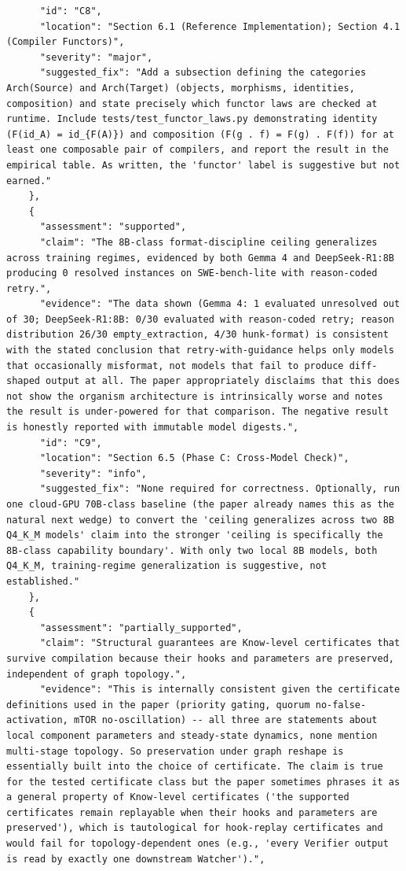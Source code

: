 \documentclass[11pt]{article}
\begin{document}
\begin{verbatim}
      "id": "C8",
      "location": "Section 6.1 (Reference Implementation); Section 4.1 (Compiler Functors)",
      "severity": "major",
      "suggested_fix": "Add a subsection defining the categories Arch(Source) and Arch(Target) (objects, morphisms, identities, composition) and state precisely which functor laws are checked at runtime. Include tests/test_functor_laws.py demonstrating identity (F(id_A) = id_{F(A)}) and composition (F(g . f) = F(g) . F(f)) for at least one composable pair of compilers, and report the result in the empirical table. As written, the 'functor' label is suggestive but not earned."
    },
    {
      "assessment": "supported",
      "claim": "The 8B-class format-discipline ceiling generalizes across training regimes, evidenced by both Gemma 4 and DeepSeek-R1:8B producing 0 resolved instances on SWE-bench-lite with reason-coded retry.",
      "evidence": "The data shown (Gemma 4: 1 evaluated unresolved out of 30; DeepSeek-R1:8B: 0/30 evaluated with reason-coded retry; reason distribution 26/30 empty_extraction, 4/30 hunk-format) is consistent with the stated conclusion that retry-with-guidance helps only models that occasionally misformat, not models that fail to produce diff-shaped output at all. The paper appropriately disclaims that this does not show the organism architecture is intrinsically worse and notes the result is under-powered for that comparison. The negative result is honestly reported with immutable model digests.",
      "id": "C9",
      "location": "Section 6.5 (Phase C: Cross-Model Check)",
      "severity": "info",
      "suggested_fix": "None required for correctness. Optionally, run one cloud-GPU 70B-class baseline (the paper already names this as the natural next wedge) to convert the 'ceiling generalizes across two 8B Q4_K_M models' claim into the stronger 'ceiling is specifically the 8B-class capability boundary'. With only two local 8B models, both Q4_K_M, training-regime generalization is suggestive, not established."
    },
    {
      "assessment": "partially_supported",
      "claim": "Structural guarantees are Know-level certificates that survive compilation because their hooks and parameters are preserved, independent of graph topology.",
      "evidence": "This is internally consistent given the certificate definitions used in the paper (priority gating, quorum no-false-activation, mTOR no-oscillation) -- all three are statements about local component parameters and steady-state dynamics, none mention multi-stage topology. So preservation under graph reshape is essentially built into the choice of certificate. The claim is true for the tested certificate class but the paper sometimes phrases it as a general property of Know-level certificates ('the supported certificates remain replayable when their hooks and parameters are preserved'), which is tautological for hook-replay certificates and would fail for topology-dependent ones (e.g., 'every Verifier output is read by exactly one downstream Watcher').",

\end{verbatim}
\end{document}
